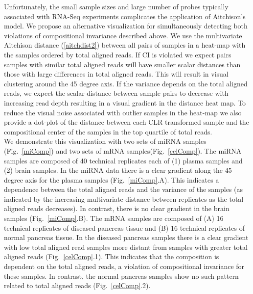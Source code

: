 \documentclass{article}\usepackage[]{graphicx}\usepackage[]{color}
\theoremstyle{definition}
\begin{document}
Unfortunately, the small sample sizes and large number of probes typically associated with RNA-Seq experiments complicates the application of Aitchison's model.  
We propose an alternative visualization for simultaneously detecting both violations of compositional invariance described above. We use the multivariate Aitchison distance (\ref{aitchdist2}) between all pairs of samples in a heat-map with the samples ordered by total aligned reads.  If CI is violated we expect pairs samples with similar total aligned reads will have smaller scalar distances than those with large differences in total aligned reads.  This will result in visual clustering around the 45 degree axis. If the variance depends on the total aligned reads, we expect the scalar distance between sample pairs to decrease with increasing read depth resulting in a visual gradient in the distance heat map.  To reduce the visual noise associated with outlier samples in the heat-map we also provide a dot-plot of the distance between each CLR transformed sample and the compositional center of the samples in the top quartile of total reads.\\

We demonstrate this visualization with two sets of miRNA samples (Fig.~\ref{miComp}) and two sets of mRNA samples(Fig.~\ref{celComp}).  The miRNA samples are composed of 40 technical replicates each of (1) plasma samples and (2) brain samples.  In the miRNA data there is a clear gradient along the 45 degree axis for the plasma samples (Fig.~\ref{miComp}.A).  This indicates a dependence between the total aligned reads and the variance of the samples (as indicated by the increasing multivariate distance between replicates as the total aligned reads decreases).  In contrast, there is no clear gradient in the brain samples (Fig.~\ref{miComp}.B).  The mRNA samples are composed of (A) 16 technical replicates of diseased pancreas tissue and (B) 16 technical replicates of normal pancreas tissue.  In the diseased pancreas samples there is a clear gradient with low total aligned read samples more distant from samples with greater total aligned reads (Fig.~\ref{celComp}.1).  This indicates that the composition is dependent on the total aligned reads, a violation of compositional invariance for these samples.  In contrast, the normal pancreas samples show no such pattern related to total aligned reads (Fig.~\ref{celComp}.2).\\
\end{document}
